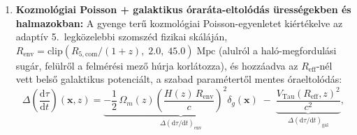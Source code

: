 \documentclass[11pt,a4paper]{article}
\begin{document}
\begin{enumerate}
  \item \textbf{Kozmológiai Poisson + galaktikus óraráta-eltolódás ürességekben és halmazokban:} A gyenge terű kozmológiai Poisson-egyenletet kiértékelve az adaptív 5.\ legközelebbi szomszéd fizikai skáláján, $R_{\mathrm{env}} = \mathrm{clip}(R_{5,\mathrm{com}}/(1+z),\; 2.0,\; 45.0)\;\mathrm{Mpc}$ (alulról a haló-megfordulási sugár, felülről a felmérési mező húrja korlátozza), és hozzáadva az $R_{\mathrm{eff}}$-nél vett belső galaktikus potenciált, a szabad paramétertől mentes óraeltolódás:
  \begin{equation}
    \Delta\!\left(\frac{\mathrm{d}\tau}{\mathrm{d}t}\right)(\mathbf{x}, z) = \underbrace{-\frac{1}{2}\,\Omega_m(z)\!\left(\frac{H(z)\,R_{\mathrm{env}}}{c}\right)^{\!2}\delta_g(\mathbf{x})}_{\Delta(\mathrm{d}\tau/\mathrm{d}t)_{\mathrm{env}}} \;-\; \underbrace{\frac{V_{\mathrm{Tau}}(R_{\mathrm{eff}}, z)^2}{c^2}}_{\Delta(\mathrm{d}\tau/\mathrm{d}t)_{\mathrm{gal}}}, \label{eq:clock_shift}
  \end{equation}

\end{enumerate}
\end{document}
